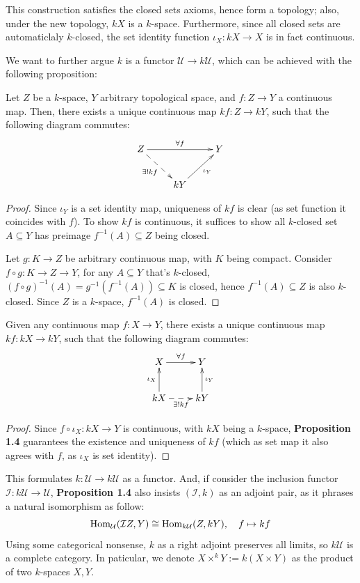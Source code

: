 \documentclass{article}
\begin{document}
This construction satisfies the closed sets axioms, hence form a topology; also, under the new topology, $kX$ is a $k$-space. Furthermore, since all closed sets are automaticlaly $k$-closed, the set identity function $\iota_X:kX\rightarrow X$ is in fact continuous.

We want to further argue $k$ is a functor $\mathcal{U}\rightarrow k\mathcal{U}$, which can be achieved with the following proposition:

\begin{prop}
Let $Z$ be a $k$-space, $Y$ arbitrary topological space, and $f:Z\rightarrow Y$ a continuous map. Then, there exists a unique continuous map $kf:Z\rightarrow kY$, such that the following diagram commutes:
\[\xymatrix{
    Z \ar@{-->}[dr]_-{\exists ! kf} \ar[rr]^-{\forall f} && Y\\
    & kY \ar[ur]_-{\iota_Y}
} \]
\end{prop}
\begin{proof}
    Since $\iota_Y$ is a set identity map, uniqueness of $kf$ is clear (as set function it coincides with $f$). To show $kf$ is continuous, it suffices to show all $k$-closed set $A\subseteq Y$ has preimage $f^{-1}(A)\subseteq Z$ being closed.

    Let $g:K\rightarrow Z$ be arbitrary continuous map, with $K$ being compact. Consider $f\circ g:K\rightarrow Z\rightarrow Y$, for any $A\subseteq Y$ that's $k$-closed, $(f\circ g)^{-1}(A)= g^{-1}(f^{-1}(A))\subseteq K$ is closed, hence $f^{-1}(A)\subseteq Z$ is also $k$-closed. Since $Z$ is a $k$-space, $f^{-1}(A)$ is closed.
\end{proof}

\begin{cor}
Given any continuous map $f:X\rightarrow Y$, there exists a unique continuous map $kf:kX\rightarrow kY$, such that the following diagram commutes:
\[\xymatrix{
    X \ar[r]^-{\forall f} & Y\\
    kX \ar[u]^-{\iota_X} \ar@{-->}[r]_-{\exists ! kf} & kY \ar[u]_-{\iota_Y}
} \]
\end{cor}
\begin{proof}
    Since $f\circ \iota_X:kX\rightarrow Y$ is continuous, with $kX$ being a $k$-space, \textbf{Proposition 1.4} guarantees the existence and uniqueness of $kf$ (which as set map it also agrees with $f$, as $\iota_X$ is set identity).
\end{proof}
This formulates $k:\mathcal{U}\rightarrow k\mathcal{U}$ as a functor. And, if consider the inclusion functor $\mathcal{I}:k\mathcal{U}\rightarrow\mathcal{U}$, \textbf{Proposition 1.4} also insists $(\mathcal{I},k)$ as an adjoint pair, as it phrases a natural isomorphism as follow:
\[\mathrm{Hom}_\mathcal{U}(\mathcal{I}Z, Y)\cong \mathrm{Hom}_{k\mathcal{U}}(Z,kY),\quad f\mapsto kf\]
Using some categorical nonsense, $k$ as a right adjoint preserves all limits, so $k\mathcal{U}$ is a complete category. In paticular, we denote $X\times^k Y:=k(X\times Y)$ as the product of two $k$-spaces $X,Y$. 
\end{document}
